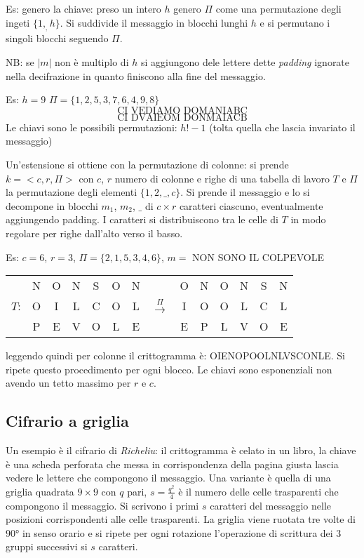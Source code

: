 Es: genero la chiave: preso un intero $h$ genero $\Pi$ come una permutazione degli ingeti $\{1,_,h\}$. Si suddivide il messaggio in blocchi lunghi $h$ e si permutano i singoli blocchi seguendo $\Pi$.

NB: se $|m|$ non è multiplo di $h$ si aggiungono dele lettere dette \emph{padding} ignorate nella decifrazione in quanto finiscono alla fine del messaggio.

Es: $h = 9$ $\Pi=\{1, 2, 5, 3, 7, 6, 4, 9, 8\}$
$$ \text{CI VEDIAMO DOMANIABC} $$
$$ \text{CI DVAIEOM DONMAIACB} $$
Le chiavi sono le possibili permutazioni: $h!-1$ (tolta quella che lascia invariato il messaggio)

Un'estensione si ottiene con la permutazione di colonne: si prende $k=<c, r, \Pi>$ con $c$, $r$ numero di colonne e righe di una tabella di lavoro $T$ e $\Pi$ la permutazione degli elementi $\{1, 2, \_, c\}$. Si prende il messaggio e lo si decompone in blocchi $m_1$, $m_2$, $\_$ di $c \times r$ caratteri ciascuno, eventualmente aggiungendo padding. I caratteri si distribuiscono tra le celle di $T$ in modo regolare per righe dall'alto verso il basso.

Es: $c = 6$, $r = 3$, $\Pi=\{2, 1, 5, 3, 4, 6\}$, $m=$ NON SONO IL COLPEVOLE
\begin{table}[!ht]
    \centering
    \begin{tabular}{c c c c c c c c c c c c c c}
             & N & O & N & S & O & N &                      & O & N & O & N & S & N\\
        $T$: & O & I & L & C & O & L & $\xrightarrow{\Pi}$  & I & O & O & L & C & L\\
             & P & E & V & O & L & E &                      & E & P & L & V & O & E\\
    \end{tabular}
\end{table}
leggendo quindi per colonne il crittogramma è: OIENOPOOLNLVSCONLE. Si ripete questo procedimento per ogni blocco. Le chiavi sono esponenziali non avendo un tetto massimo per $r$ e $c$.


\subsection{Cifrario a griglia}
Un esempio è il cifrario di \emph{Richeliu}: il crittogramma è celato in un libro, la chiave è una scheda perforata che messa in corrispondenza della pagina giusta lascia vedere le lettere che compongono il messaggio. Una variante è quella di una griglia quadrata $9\times9$ con $q$ pari, $s = \frac{q^2}{4}$ è il numero delle celle trasparenti che compongono il messaggio. Si scrivono i primi $s$ caratteri del messaggio nelle posizioni corrispondenti alle celle trasparenti. La griglia viene ruotata tre volte di $90$° in senso orario e si ripete per ogni rotazione l'operazione di scrittura dei 3 gruppi successivi si $s$ caratteri.

